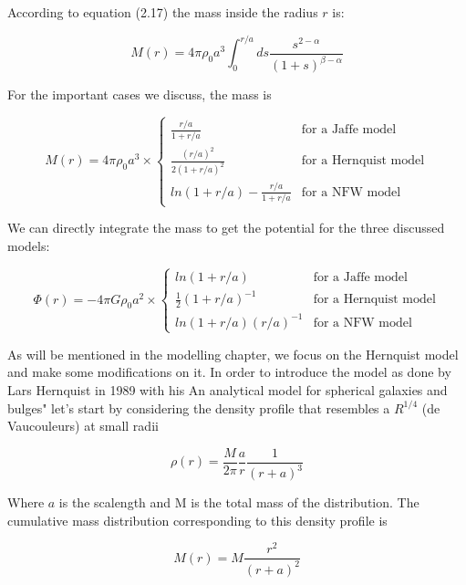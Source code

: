 According to equation (2.17) the mass inside the radius $r$ is:

\begin{equation}
M(r)=4\pi \rho_{0}a^{3}\int_{0}^{r/a}ds\frac{s^{2-\alpha}}{(1+s)^{\beta-\alpha}}
\end{equation}

For the important cases we discuss, the mass is

\begin{equation}
M(r) = 4\pi \rho_{0}a^{3} \times \left\lbrace
\begin{array}{lll}
\frac{r/a}{1+r/a} & \text{for a Jaffe model}\\
\frac{(r/a)^{2}}{2(1+r/a)^{2}} & \text{for a Hernquist model}\\
ln(1+r/a)-\frac{r/a}{1+r/a} & \text{for a NFW model}
\end{array}
\right.
\end{equation} 

We can directly integrate the mass to get the potential for the three discussed models:

\begin{equation}
\Phi(r) = -4\pi G\rho_{0}a^{2} \times \left\lbrace
\begin{array}{lll}
ln(1+r/a) & \text{for a Jaffe model}\\
\frac{1}{2}(1+r/a)^{-1} & \text{for a Hernquist model}\\
ln(1+r/a)(r/a)^{-1} & \text{for a NFW model}
\end{array}
\right.
\end{equation} 

As will be mentioned in the modelling chapter, we focus on the Hernquist model and make some modifications on it. In order to introduce the model as done by Lars Hernquist in 1989 with his An analytical model for spherical galaxies and bulges" let's start by considering the density profile that resembles a $R^{1/4}$ (de Vaucouleurs) at small radii

\begin{equation}
\rho(r)=\frac{M}{2\pi}\frac{a}{r}\frac{1}{\left(r+a\right)^{3}}
\end{equation}

Where $a$ is the scalength and M is the total mass of the distribution. The cumulative mass distribution corresponding to this density profile is

\begin{equation}
M(r)=M\frac{r^{2}}{\left(r+a\right)^{2}}
\end{equation}  

